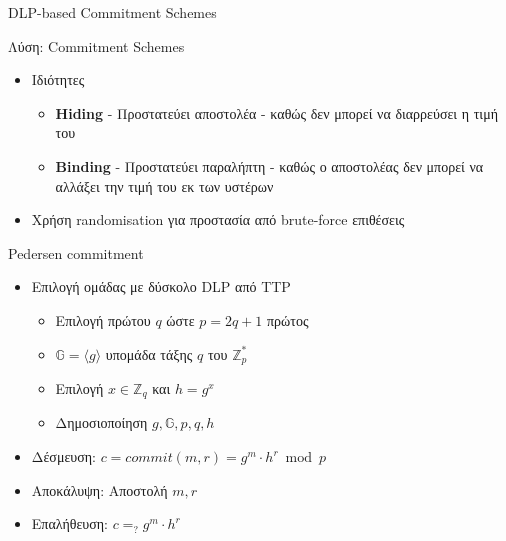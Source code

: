 \documentclass[handout]{beamer}
\begin{document}
\begin{frame}{DLP-based Commitment Schemes}
\begin{block}{Λύση:  Commitment Schemes}
\begin{itemize}
\item Ιδιότητες
\pause
\begin{itemize}
\item \textbf{Hiding} - Προστατεύει αποστολέα -  καθώς δεν μπορεί να διαρρεύσει η τιμή του
\pause
\item \textbf{Binding} - Προστατεύει παραλήπτη -  καθώς ο αποστολέας δεν μπορεί να αλλάξει την τιμή του εκ των υστέρων
\pause
\end{itemize}
\item Χρήση randomisation για προστασία από brute-force επιθέσεις
\end{itemize}
\end{block}
\end{frame}

\begin{frame}{Pedersen commitment}
\begin{itemize}
\item  Επιλογή ομάδας με δύσκολο DLP από TTP
\begin{itemize}
\item Επιλογή πρώτου $q$ ώστε $p=2q+1$ πρώτος
\item $\mathbb{G}=\langle g \rangle$ υπομάδα τάξης $q$ του $\mathbb{Z}_p^*$
\item Επιλογή $x \in \mathbb{Z}_q$ και $h=g^x$
\item Δημοσιοποίηση $g,\mathbb{G},p,q,h$
\end{itemize}
\pause
\item Δέσμευση: $c=commit(m,r) = g^m \cdot h^r \bmod{p}$
\pause
\item Αποκάλυψη: Αποστολή $m,r$
\pause
\item Επαλήθευση: $c =_? g^m \cdot h^r$
\end{itemize}
\end{frame}
\end{document}
